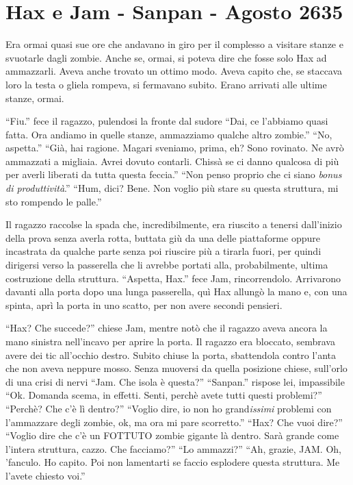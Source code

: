   \section{Hax e Jam - Sanpan - Agosto 2635}
    
    Era ormai quasi sue ore che andavano in giro per il complesso a visitare
    stanze e svuotarle dagli zombie. Anche se, ormai, si poteva dire che
    fosse solo Hax ad ammazzarli. Aveva anche trovato un ottimo modo. Aveva
    capito che, se staccava loro la testa o gliela rompeva, si fermavano
    subito. Erano arrivati alle ultime stanze, ormai.

    ``Fiu.'' fece il ragazzo, pulendosi la fronte dal sudore ``Dai, ce
    l'abbiamo quasi fatta. Ora andiamo in quelle stanze, ammazziamo qualche
    altro zombie.'' ``No, aspetta.'' ``Già, hai ragione. Magari sveniamo,
    prima, eh? Sono rovinato. Ne avrò ammazzati a migliaia. Avrei dovuto
    contarli. Chissà se ci danno qualcosa di più per averli liberati da
    tutta questa feccia.'' ``Non penso proprio che ci siano \emph{bonus di
    produttività}.'' ``Hum, dici? Bene. Non voglio più stare su questa
    struttura, mi sto rompendo le palle.''

    Il ragazzo raccolse la spada che, incredibilmente, era riuscito a
    tenersi dall'inizio della prova senza averla rotta, buttata giù da una
    delle piattaforme oppure incastrata da qualche parte senza poi
    riuscire più a tirarla fuori, per quindi dirigersi verso la passerella
    che li avrebbe portati alla, probabilmente, ultima costruzione della
    struttura. ``Aspetta, Hax.'' fece Jam, rincorrendolo. Arrivarono
    davanti alla porta dopo una lunga passerella, quì Hax allungò la mano
    e, con una spinta, aprì la porta in uno scatto, per non avere secondi
    pensieri.

    ``Hax? Che succede?'' chiese Jam, mentre notò che il ragazzo aveva
    ancora la mano sinistra nell'incavo per aprire la porta. Il ragazzo era
    bloccato, sembrava avere dei tic all'occhio destro. Subito chiuse la
    porta, sbattendola contro l'anta che non aveva neppure mosso. Senza
    muoversi da quella posizione chiese, sull'orlo di una crisi di nervi
    ``Jam. Che isola è questa?'' ``Sanpan.'' rispose lei, impassibile ``Ok.
    Domanda scema, in effetti. Senti, perchè avete tutti questi problemi?''
    ``Perchè? Che c'è lì dentro?'' ``Voglio dire, io non ho
    grand\emph{issimi} problemi con l'ammazzare degli zombie, ok, ma ora mi
    pare scorretto.'' ``Hax? Che vuoi dire?'' ``Voglio dire che c'è un
    FOTTUTO zombie gigante là dentro. Sarà grande come l'intera struttura,
    cazzo. Che facciamo?'' ``Lo ammazzi?'' ``Ah, grazie, JAM. Oh, 'fanculo.
    Ho capito. Poi non lamentarti se faccio esplodere questa struttura. Me
    l'avete chiesto voi.''

